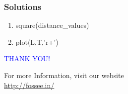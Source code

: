 \documentclass[presentation]{beamer}
\begin{document}
\begin{frame}
\frametitle{Solutions}
\label{sec-10}


\begin{enumerate}
\item square(distance\_values)
\vspace{8pt}
\item plot(L,T,'r+')
\end{enumerate}
\end{frame}
\begin{frame}

  \begin{block}{}
  \begin{center}
  \textcolor{blue}{\Large THANK YOU!} 
  \end{center}
  \end{block}
\begin{block}{}
  \begin{center}
    For more Information, visit our website\\
    \url{http://fossee.in/}
  \end{center}  
  \end{block}                                                                                                                                             
\end{frame}
\end{document}
